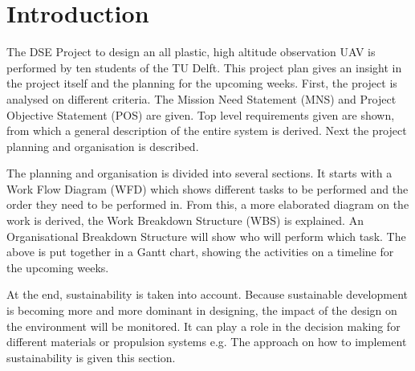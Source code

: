 \documentclass[a4paper]{report}
\begin{document}
\chapter{Introduction}
The DSE Project to design an all plastic, high altitude observation UAV is performed by ten students of the TU Delft. This project plan gives an insight in the project itself and the planning for the upcoming weeks. First, the project is analysed on different criteria. The Mission Need Statement (MNS) and Project Objective Statement (POS) are given. Top level requirements given are shown, from which a general description of the entire system is derived. Next the project planning and organisation is described.

The planning and organisation is divided into several sections. It starts with a Work Flow Diagram (WFD) which shows different tasks to be performed and the order they need to be performed in. From this, a more elaborated diagram on the work is derived, the Work Breakdown Structure (WBS) is explained. An Organisational Breakdown Structure will show who will perform which task. The above is put together in a Gantt chart, showing the activities on a timeline for the upcoming weeks.

At the end, sustainability is taken into account. Because sustainable development is becoming more and more dominant in designing, the impact of the design on the environment will be monitored. It can play a role in the decision making for different materials or propulsion systems e.g. The approach on how to implement sustainability is given this section.

\end{document}
